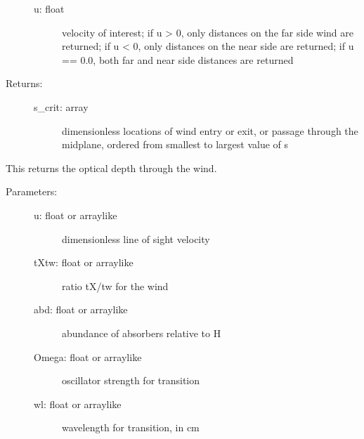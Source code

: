 \documentclass[letterpaper,10pt,english]{sphinxmanual}
\begin{document}
\begin{fulllineitems}
\begin{fulllineitems}
\begin{description}
\begin{description}
\item[{u: float}] \leavevmode
velocity of interest; if u \textgreater{} 0, only distances on the
far side wind are returned; if u \textless{} 0, only
distances on the near side are returned; if u == 0.0,
both far and near side distances are returned

\end{description}

\item[{Returns:}] \leavevmode\begin{description}
\item[{s\_crit: array}] \leavevmode
dimensionless locations of wind entry or exit, or
passage through the midplane, ordered from smallest to
largest value of s

\end{description}

\end{description}

\end{fulllineitems}


\begin{fulllineitems}
\label{fulldoc:despotic.winds.pwind.tau}
This returns the optical depth through the wind.
\begin{description}
\item[{Parameters:}] \leavevmode\begin{description}
\item[{u: float or arraylike}] \leavevmode
dimensionless line of sight velocity

\item[{tXtw: float or arraylike}] \leavevmode
ratio tX/tw for the wind

\item[{abd: float or arraylike}] \leavevmode
abundance of absorbers relative to H

\item[{Omega: float or arraylike}] \leavevmode
oscillator strength for transition

\item[{wl: float or arraylike}] \leavevmode
wavelength for transition, in cm


\end{description}
\end{description}
\end{fulllineitems}
\end{fulllineitems}
\end{document}
